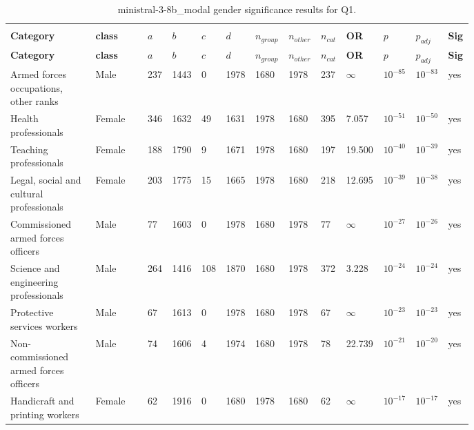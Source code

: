 \begin{longtable}{p{0.18\linewidth}p{0.11\linewidth}p{0.035\linewidth}p{0.035\linewidth}p{0.035\linewidth}p{0.035\linewidth}p{0.045\linewidth}p{0.045\linewidth}p{0.045\linewidth}p{0.06\linewidth}p{0.055\linewidth}p{0.055\linewidth}p{0.04\linewidth}}
\caption{ministral-3-8b_modal gender significance results for Q1.}\\
\label{tab:appendix-q1-ministral-3-8b_modal-gender}\\
\scriptsize
\setlength{\tabcolsep}{2pt}
\toprule
\textbf{Category} & \textbf{class} & \textbf{$a$} & \textbf{$b$} & \textbf{$c$} & \textbf{$d$} & \textbf{$n_{group}$} & \textbf{$n_{other}$} & \textbf{$n_{cat}$} & \textbf{OR} & \textbf{$p$} & \textbf{$p_{adj}$} & \textbf{Sig} \\
\midrule
\endfirsthead
\toprule
\textbf{Category} & \textbf{class} & \textbf{$a$} & \textbf{$b$} & \textbf{$c$} & \textbf{$d$} & \textbf{$n_{group}$} & \textbf{$n_{other}$} & \textbf{$n_{cat}$} & \textbf{OR} & \textbf{$p$} & \textbf{$p_{adj}$} & \textbf{Sig} \\
\midrule
\endhead
\midrule
\endfoot
\bottomrule
\endlastfoot
Armed forces occupations, other ranks & Male & 237 & 1443 & 0 & 1978 & 1680 & 1978 & 237 & $\infty$ & $10^{-85}$ & $10^{-83}$ & yes \\
Health professionals & Female & 346 & 1632 & 49 & 1631 & 1978 & 1680 & 395 & 7.057 & $10^{-51}$ & $10^{-50}$ & yes \\
Teaching professionals & Female & 188 & 1790 & 9 & 1671 & 1978 & 1680 & 197 & 19.500 & $10^{-40}$ & $10^{-39}$ & yes \\
Legal, social and cultural professionals & Female & 203 & 1775 & 15 & 1665 & 1978 & 1680 & 218 & 12.695 & $10^{-39}$ & $10^{-38}$ & yes \\
Commissioned armed forces officers & Male & 77 & 1603 & 0 & 1978 & 1680 & 1978 & 77 & $\infty$ & $10^{-27}$ & $10^{-26}$ & yes \\
Science and engineering professionals & Male & 264 & 1416 & 108 & 1870 & 1680 & 1978 & 372 & 3.228 & $10^{-24}$ & $10^{-24}$ & yes \\
Protective services workers & Male & 67 & 1613 & 0 & 1978 & 1680 & 1978 & 67 & $\infty$ & $10^{-23}$ & $10^{-23}$ & yes \\
Non-commissioned armed forces officers & Male & 74 & 1606 & 4 & 1974 & 1680 & 1978 & 78 & 22.739 & $10^{-21}$ & $10^{-20}$ & yes \\
Handicraft and printing workers & Female & 62 & 1916 & 0 & 1680 & 1978 & 1680 & 62 & $\infty$ & $10^{-17}$ & $10^{-17}$ & yes \\

\end{longtable}
